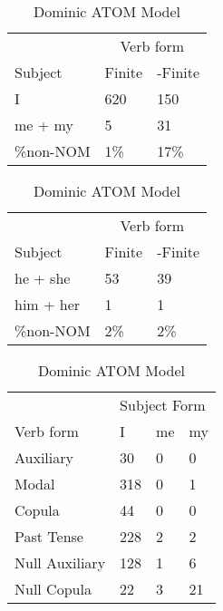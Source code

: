 \begin{table}[]
    \caption{Dominic ATOM Model}
    \begin{minipage}{0.5\textwidth}
    \centering
    \begin{tabular}{@{}lll@{}}
        \toprule
         &\multicolumn{2}{c}{Verb form}\\
         \cline{2-3}
        Subject & Finite & -Finite \\
        \midrule
        I & 620 & 150 \\
        me + my & 5 & 31 \\
        \hline
        \%non-NOM & 1\% & 17\% \\
        \bottomrule
    \end{tabular}
\end{minipage}
\begin{minipage}{0.5\textwidth}
    \centering
    \begin{tabular}{@{}lll@{}}
        \toprule
         &\multicolumn{2}{c}{Verb form}\\
         \cline{2-3}
        Subject & Finite & -Finite \\
        \midrule
        he + she & 53 & 39 \\
        him + her & 1 & 1 \\
        \hline
        \%non-NOM & 2\% & 2\% \\
        \bottomrule
    \end{tabular}
    \end{minipage}
    \begin{minipage}{0.5\textwidth}
    \centering
    \begin{tabular}{@{}llll@{}}
        \toprule
            &\multicolumn{3}{l}{Subject Form}\\
            \cline{2-4}
        Verb form & I & me & my \\
        \midrule
        Auxiliary & 30 & 0 & 0 \\
        Modal & 318 & 0 & 1 \\
        Copula & 44 & 0 & 0 \\
        Past Tense & 228 & 2 & 2 \\
        \hline
        Null Auxiliary & 128 & 1 & 6 \\
        Null Copula & 22 & 3 & 21 \\
        \bottomrule
    \end{tabular}

\end{minipage}
\end{table}
